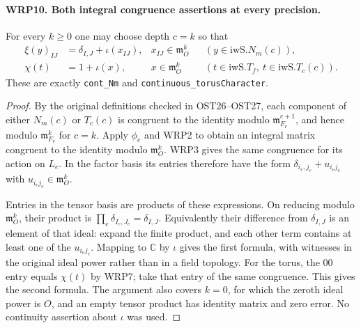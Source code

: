 \documentclass[11pt,a4paper]{article}
\numberwithin{equation}{section}
\theoremstyle{remark}\newtheorem{remark}[theorem]{Remark}
\begin{document}
\paragraph{WRP10. Both integral congruence assertions at every precision.}
\label{claim:WRP10}
For every $k\geq0$ one may choose depth $c=k$ so that
\begin{align}
 \xi(y)_{IJ}&=\delta_{I,\allowbreak{} J}+\iota(x_{IJ}),
       &x_{IJ}\in\mathfrak m_O^k
                  &&(y\in\mathrm{iwS}.N_m(c)),\\
 \chi(t)&=1+\iota(x),
       &x\in\mathfrak m_O^k
                  &&(t\in\mathrm{iwS}.T_f,\ t\in\mathrm{iwS}.T_c(c)).
 \label{eq:wrp-continuity}
\end{align}
These are exactly \texttt{cont\_\allowbreak Nm} and
\texttt{continuous\_\allowbreak torus\allowbreak Character}.
\begin{proof}
By the original definitions checked in OST26--OST27,
each component of either $N_m(c)$ or $T_c(c)$ is
congruent to the identity modulo
$\mathfrak m_{F_v}^{c+1}$, and hence modulo
$\mathfrak m_{F_v}^k$ for $c=k$.  Apply $\phi_e$ and
WRP2 to obtain an integral matrix congruent to the
identity modulo $\mathfrak m_O^k$.  WRP3 gives the same
congruence for its action on $L_e$.  In the factor basis
its entries therefore have the form
$\delta_{i_e,\allowbreak{} j_e}+u_{i_ej_e}$ with
$u_{i_ej_e}\in\mathfrak m_O^k$.

Entries in the tensor basis are products of these
expressions.  On reducing modulo $\mathfrak m_O^k$,
their product is $\prod_e\delta_{I_e,\allowbreak{} J_e}=\delta_{I,\allowbreak{} J}$.
Equivalently their difference from $\delta_{I,\allowbreak{} J}$ is
an element of that ideal: expand the finite product,
and each other term contains at least one of the
$u_{i_ej_e}$.  Mapping to $\mathbb C$ by $\iota$ gives
the first formula, with witnesses in the original ideal
power rather than in a field topology.  For the torus,
the $00$ entry equals $\chi(t)$ by WRP7; take that entry
of the same congruence.  This gives the second formula.
The argument also covers $k=0$, for which the zeroth
ideal power is $O$, and an empty tensor product has
identity matrix and zero error.  No continuity assertion
about $\iota$ was used.
\end{proof}

\end{document}
